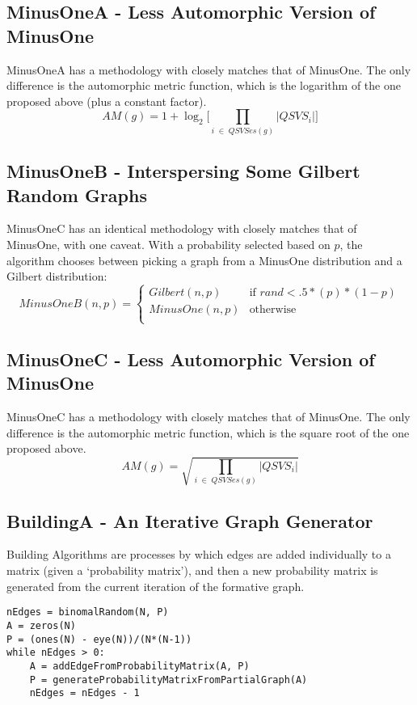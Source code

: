 \subsection{MinusOneA - Less Automorphic Version of MinusOne}

MinusOneA has a methodology with closely matches that of MinusOne.
The only difference is the automorphic metric function, which is the logarithm of the one proposed above (plus a constant factor).
$$AM(g) = 1 + \log_2 \Big[{\prod_{i \;\in \;QSVSes(g)} |QSVS_i|} \Big]$$

\subsection{MinusOneB - Interspersing Some Gilbert Random Graphs}

MinusOneC has an identical methodology with closely matches that of MinusOne, with one caveat.
With a probability selected based on $p$, the algorithm chooses between picking a graph from a MinusOne distribution and a Gilbert distribution:
\[ MinusOneB(n, p) = \begin{cases} 
      Gilbert(n, p) & \text{if $rand < .5 * (p) * (1-p)$} \\
      MinusOne(n, p) & \text{otherwise} \\
   \end{cases}
\]

\subsection{MinusOneC - Less Automorphic Version of MinusOne}

MinusOneC has a methodology with closely matches that of MinusOne.
The only difference is the automorphic metric function, which is the square root of the one proposed above.
$$AM(g) = \sqrt{\prod_{i \;\in \;QSVSes(g)} |QSVS_i|}$$

\subsection{BuildingA - An Iterative Graph Generator}

Building Algorithms are processes by which edges are added individually to a matrix (given a `probability matrix'), and then a new probability matrix is generated from the current iteration of the formative graph.

\begin{lstlisting}[frame=single]
nEdges = binomalRandom(N, P)
A = zeros(N)
P = (ones(N) - eye(N))/(N*(N-1))
while nEdges > 0:
	A = addEdgeFromProbabilityMatrix(A, P)
	P = generateProbabilityMatrixFromPartialGraph(A)
	nEdges = nEdges - 1
\end{lstlisting}

